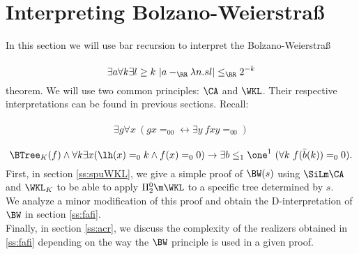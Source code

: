 \section{Interpreting Bolzano-Weierstra{\ss}} \label{s:bw}
In this section we will use bar recursion
 to interpret the Bolzano-Weierstra{\ss} 
\paragraph{}
\[
  \exists a\forall k\exists l\geq k\ |a-_\RR\lambda n.sl|\leq_\RR2^{-k}
\]
theorem. We will use two common principles: $\CA$ and $\WKL$. 
Their respective interpretations can be found in previous sections. Recall:
\paragraph{}
\[
  \exists g \forall x\ (gx=_00 \leftrightarrow \exists y\ fxy=_00)
\]
\paragraph{}
\[
  \BTree_K(f) \wedge \forall k\exists x (\lh(x)=_0k \wedge f(x)=_00) 
     \rightarrow \exists b\leq_1\one^1\ (\forall k\ f(\bar{b}(k))=_00)
\text{.}
\]
First, in section \ref{ss:spuWKL}, we give a simple 
proof of $\BW(s)$ using $\SiLm\CA$ and $\WKL_K$
to be able to apply $\Pi^0_2\m\WKL$ to a specific tree determined by $s$.\\
We analyze a minor modification of this proof and obtain the D-interpretation
of $\BW$ in section \ref{ss:fafi}.\\
Finally, in section \ref{ss:acr}, we discuss the complexity of the realizers 
obtained in \ref{ss:fafi} depending on the way the $\BW$ principle is used in
a given proof.

